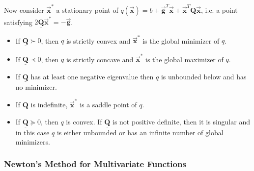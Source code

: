 \documentclass[9pt, headings=standardclasses, parskip=half]{scrartcl}
\newcommand{\matr}[1]{\underline{\boldsymbol{#1}}}
\newcommand{\vect}[1]{\vec{\boldsymbol{#1}}}
\begin{document}
Now consider \(\vect{x}^{*}\) a stationary point of \(q(\vect{x}) = b + \vect{g}^{T}\vect{x} + \vect{x}^{T}\matr{Q}\vect{x}\), i.e. a point satisfying \(2\matr{Q}\vect{x}^{*} = -\vect{g}\).
\begin{itemize}
\item If \(\matr{Q} \succ 0\), then \(q\) is strictly convex and \(\vect{x}^{*}\) is the global minimizer of \(q\).
\item If \(\matr{Q} \prec 0\), then \(q\) is strictly concave and \(\vect{x}^{*}\) is the global maximizer of \(q\).
\item If \(\matr{Q}\) has at least one negative eigenvalue then \(q\) is unbounded below and has no minimizer.
\item If \(\matr{Q}\) is indefinite, \(\vect{x}^{*}\) is a saddle point of \(q\).
\item If \(\matr{Q} \succeq 0\), then \(q\) is convex. If \(\matr{Q}\) is not positive definite, then it is singular and in this case \(q\) is either unbounded or has an infinite number of global minimizers.
\end{itemize}

\subsubsection{Newton's Method for Multivariate Functions}
\label{subsubsec:newton_multivariate}







\end{document}

